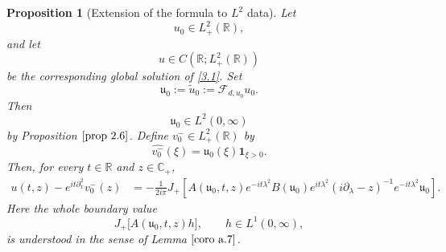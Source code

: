 \documentclass[10pt]{article}
\newtheorem{proposition}[theorem]{Proposition}
\numberwithin{equation}{section}
\numberwithin{theorem}{section}
\begin{document}
\begin{proposition}[Extension of the formula to \(L^2\) data]
\label{prop:rough_defect_formula}
Let
\[
u_0\in L^2_+(\mathbb R),
\]
and let
\[
u\in C(\mathbb R;L^2_+(\mathbb R))
\]
be the corresponding global solution of \eqref{3.1}. Set
\[
\mathfrak u_0:=\widetilde u_0:=\mathcal F_{d,u_0}u_0.
\]
Then
\[
\mathfrak u_0\in L^2(0,\infty)
\]
by Proposition \(\ref{prop 2.6}\). Define \(v_0^-\in L^2_+(\mathbb R)\) by
\[
\widehat{v_0^-}(\xi)=\mathfrak u_0(\xi)\mathbf 1_{\xi>0}.
\]
Then, for every \(t\in\mathbb R\) and \(z\in\mathbb C_+\),
\begin{equation}
\label{3.28}
\begin{aligned}
u(t,z)-e^{it\partial_x^2}v_0^-(z)
&=
-\frac1{2i\pi}
J_+\left[
A(\mathfrak u_0,t,z)
e^{-it\lambda^2}
B(\mathfrak u_0)
e^{it\lambda^2}
(i\partial_\lambda-z)^{-1}
e^{-it\lambda^2}\mathfrak u_0
\right].
\end{aligned}
\end{equation}
Here the whole boundary value
\[
J_+\bigl[A(\mathfrak u_0,t,z)h\bigr],
\qquad h\in L^1(0,\infty),
\]
is understood in the sense of Lemma \(\ref{coro a.7}\).
\end{proposition}
\end{document}
